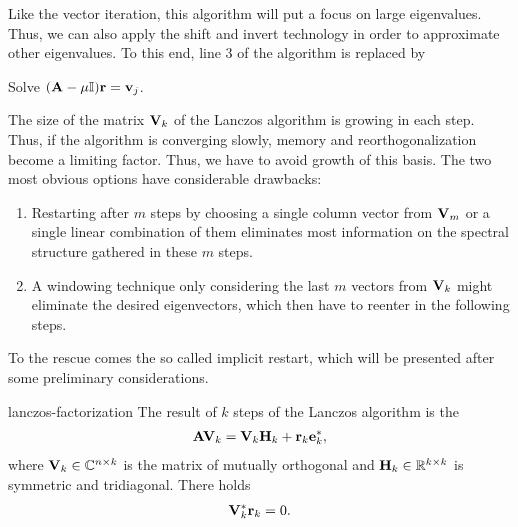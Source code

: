 \begin{remark}
  Like the vector iteration, this algorithm will put a focus on large
  eigenvalues. Thus, we can also apply the shift and invert technology
  in order to approximate other eigenvalues. To this end, line 3 of
  the algorithm is replaced by
  \begin{algorithmic}
    \State Solve $(\mathbf A-\mu\mathbb I)\mathbf r = \mathbf v_j$.
  \end{algorithmic}
\end{remark}

\begin{intro}
  The size of the matrix $\mathbf V_k$ of the Lanczos algorithm is growing
  in each step. Thus, if the algorithm is converging slowly, memory
  and reorthogonalization become a limiting factor. Thus, we have to
  avoid growth of this basis. The two most obvious options have
  considerable drawbacks:
  \begin{enumerate}
  \item Restarting after $m$ steps by choosing a single column vector
    from $\mathbf V_m$ or a single linear combination of them eliminates
    most information on the spectral structure gathered in these $m$
    steps.
  \item A windowing technique only considering the last $m$ vectors
    from $\mathbf V_k$ might eliminate the desired eigenvectors, which
    then have to reenter in the following steps.
  \end{enumerate}
  To the rescue comes the so called implicit restart, which will be
  presented after some preliminary considerations.
\end{intro}

\begin{Definition}{lanczos-factorization}
  The result of $k$ steps of the Lanczos algorithm is the
  \begin{gather}
    \mathbf A\mathbf V_k = \mathbf V_k\mathbf H_k + \mathbf r_k\mathbf e_k^*,
  \end{gather}
  where $\mathbf V_k\in\mathbb C^{n\times k}$ is the matrix of mutually
  orthogonal  and $\mathbf H_k\in\mathbb R^{k\times k}$
  is symmetric and tridiagonal. There holds
  \begin{gather}
    \mathbf V_k^*\mathbf r_k = 0.
  \end{gather}
\end{Definition}

